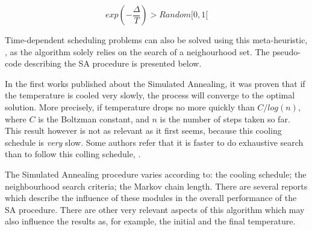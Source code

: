 \begin{equation}
\label{eq:metropolis}
  exp(-\frac{\Delta}{T}) > Random[0, 1[
\end{equation}

Time-dependent scheduling problems can also be solved using this meta-heuristic, \cite{simulated_annealing_2},
as the algorithm solely relies on the search of a neighourhood set. The pseudo-code describing the SA procedure 
is presented below. 

In the first works published about the Simulated Annealing, it was proven that if the temperature is cooled very slowly, 
the process will converge to the optimal solution. More precisely, 
if temperature drops no more quickly than $C/log(n)$, where $C$ is the Boltzman constant, and $n$ is the number of steps taken so far.
This result however is not as relevant as it first seems, because this cooling schedule is \textit{very} slow.
Some authors refer that it is faster to do exhaustive search than to follow this colling schedule, \cite{local_search_book}.

The Simulated Annealing procedure varies according to: the cooling schedule; the neighbourhood search criteria; the Markov chain length.
There are several reports which describe the influence of these modules in the overall performance of the SA procedure.
There are other very relevant aspects of this algorithm which may also influence the results as, for example,
the initial and the final temperature. 






